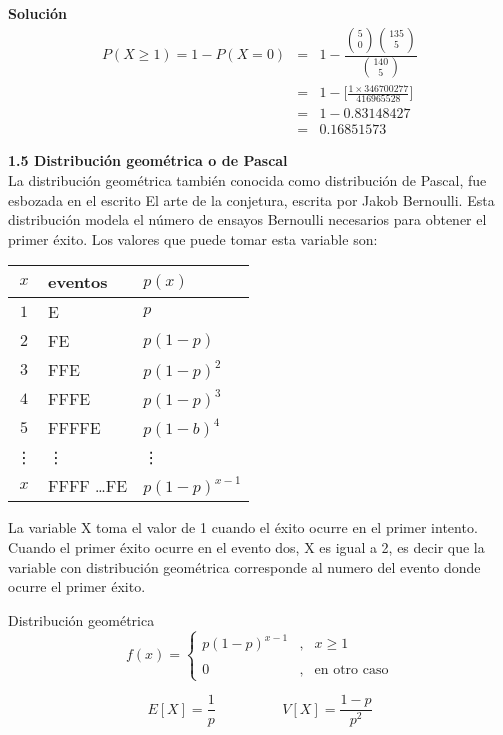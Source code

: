 \documentclass[base=hide,12pt]{elegantbook}
\begin{document}
\vspace{.5cm} 
\textcolor{col3}{\bf \large Solución}\\
\begin{eqnarray*}
	P(X\geq 1)=1-P(X=0)
	&=& 1 - \dfrac{\displaystyle\binom{5}{0}\displaystyle\binom{135}{5}}{\displaystyle\binom{140}{5}}\\
	&=& 1-\Bigg[\frac{1  \times 346700277}{416965528} \Bigg] \\
	&=& 1 - 0.83148427 \\
	&=& 0.16851573
\end{eqnarray*}

\vspace{1cm}
\textcolor{col4}{\LARGE  \bf 1.5 Distribución geométrica o de Pascal }\\

La distribución geométrica también conocida como distribución de Pascal, fue esbozada en el escrito El arte de la conjetura, escrita por Jakob Bernoulli. Esta distribución modela el número de ensayos Bernoulli necesarios para obtener el primer éxito. Los valores que puede tomar esta variable son:\\

\begin{center}
	\begin{tabular}{c|l|l}
	\hline
	$x$ & eventos&  $p(x)$ \\ 
	\hline
	$1$ & E     & $p$\\
	$2$ & FE    & $p(1-p)$\\
	$3$ & FFE   & $p(1-p)^{2}$\\
	$4$ & FFFE  &$p(1-p)^{3}$ \\
	$5$ & FFFFE & $p(1-b)^{4}$\\
	\vdots & \vdots & \vdots\\
	$x$   &FFFF \ldots FE & $p(1-p)^{x-1}$ \\
	\hline
\end{tabular}
\end{center}

La variable X toma el valor de 1 cuando el éxito ocurre en el primer intento. Cuando el primer éxito ocurre en el evento dos, X es igual a 2, es decir que la variable con distribución geométrica corresponde al numero del evento donde ocurre el primer éxito.

\vspace{.5cm} 

\begin{Box2}{Distribución geométrica}
	\begin{equation*}
		f(x)=\left\lbrace
		\begin{array}{lll}
			p(1-p)^{x-1}	 &,& x \geq 1   \\
			&&\\
			0 &,& \mbox{en otro caso}
		\end{array}
		\right.
	\end{equation*}
	
	
	$$E[X]=\dfrac{1}{p} \hspace{2cm} V[X]=\dfrac{1-p}{p^{2}} $$
\end{Box2}
\end{document}
